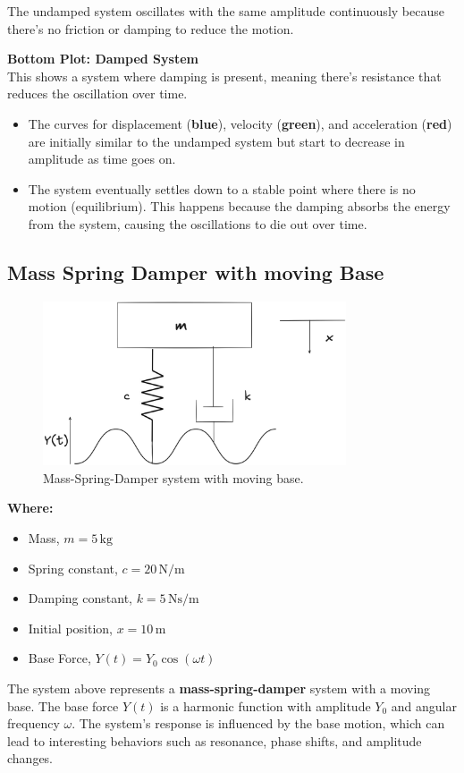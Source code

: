 \documentclass[12pt,a4paper]{article}
\begin{document}
\noindent The undamped system oscillates with the same amplitude continuously because there's no friction or damping to reduce the motion.

{\vspace{10pt}}
\noindent \textbf{Bottom Plot: Damped System}\\
This shows a system where damping is present, meaning there's resistance that reduces the oscillation over time.

\begin{itemize}
    \item The curves for displacement (\textbf{blue}), velocity (\textbf{green}), and acceleration (\textbf{red}) are initially similar to the undamped system but start to decrease in amplitude as time goes on.
    \item The system eventually settles down to a stable point where there is no motion (equilibrium). This happens because the damping absorbs the energy from the system, causing the oscillations to die out over time.
\end{itemize}

{\vspace{10pt}}

\subsection{Mass Spring Damper with moving Base}
\begin{figure}[H]
    \centering
    \includegraphics[width=0.8\textwidth]{msd_base.png} 
    \caption{Mass-Spring-Damper system with moving base.}
    \label{fig:system}
\end{figure}
\textbf{Where:}
\begin{itemize}
    \item Mass, \(m = 5 \, \text{kg}\)
    \item Spring constant, \(c = 20 \, \text{N/m}\)
    \item Damping constant, \(k = 5 \, \text{Ns/m}\)
    \item Initial position, \(x = 10 \, \text{m}\)
    \item Base Force, \(Y(t) = Y_0 \cos(\omega t)\)    
\end{itemize}
{\vspace{5pt}}
The system above represents a \textbf{mass-spring-damper} system with a moving base. The base force \(Y(t)\) is a harmonic function with amplitude \(Y_0\) and angular frequency \(\omega\). The system's response is influenced by the base motion, which can lead to interesting behaviors such as resonance, phase shifts, and amplitude changes.
\end{document}

